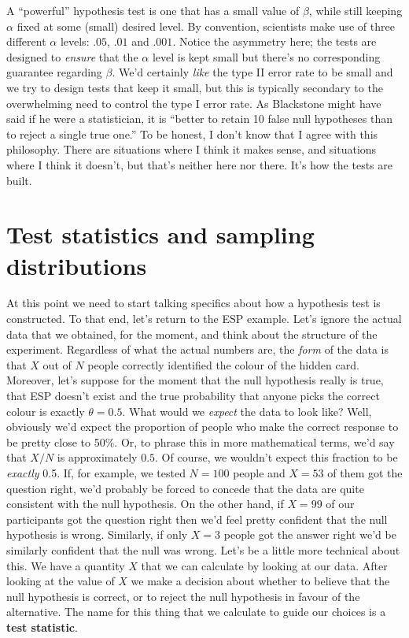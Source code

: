 \documentclass[
]{book}
\begin{document}
A ``powerful'' hypothesis test is one that has a small value of \(\beta\), while still keeping \(\alpha\) fixed at some (small) desired level. By convention, scientists make use of three different \(\alpha\) levels: \(.05\), \(.01\) and \(.001\). Notice the asymmetry here; the tests are designed to \emph{ensure} that the \(\alpha\) level is kept small but there's no corresponding guarantee regarding \(\beta\). We'd certainly \emph{like} the type II error rate to be small and we try to design tests that keep it small, but this is typically secondary to the overwhelming need to control the type I error rate. As Blackstone might have said if he were a statistician, it is ``better to retain 10 false null hypotheses than to reject a single true one.'' To be honest, I don't know that I agree with this philosophy. There are situations where I think it makes sense, and situations where I think it doesn't, but that's neither here nor there. It's how the tests are built.

\hypertarget{teststatistics}{%
\section{Test statistics and sampling distributions}\label{teststatistics}}

At this point we need to start talking specifics about how a hypothesis test is constructed. To that end, let's return to the ESP example. Let's ignore the actual data that we obtained, for the moment, and think about the structure of the experiment. Regardless of what the actual numbers are, the \emph{form} of the data is that \(X\) out of \(N\) people correctly identified the colour of the hidden card. Moreover, let's suppose for the moment that the null hypothesis really is true, that ESP doesn't exist and the true probability that anyone picks the correct colour is exactly \(\theta = 0.5\). What would we \emph{expect} the data to look like? Well, obviously we'd expect the proportion of people who make the correct response to be pretty close to 50\%. Or, to phrase this in more mathematical terms, we'd say that \(X/N\) is approximately \(0.5\). Of course, we wouldn't expect this fraction to be \emph{exactly} 0.5. If, for example, we tested \(N=100\) people and \(X = 53\) of them got the question right, we'd probably be forced to concede that the data are quite consistent with the null hypothesis. On the other hand, if \(X = 99\) of our participants got the question right then we'd feel pretty confident that the null hypothesis is wrong. Similarly, if only \(X=3\) people got the answer right we'd be similarly confident that the null was wrong. Let's be a little more technical about this. We have a quantity \(X\) that we can calculate by looking at our data. After looking at the value of \(X\) we make a decision about whether to believe that the null hypothesis is correct, or to reject the null hypothesis in favour of the alternative. The name for this thing that we calculate to guide our choices is a {\textbf{test statistic}}.
\end{document}
